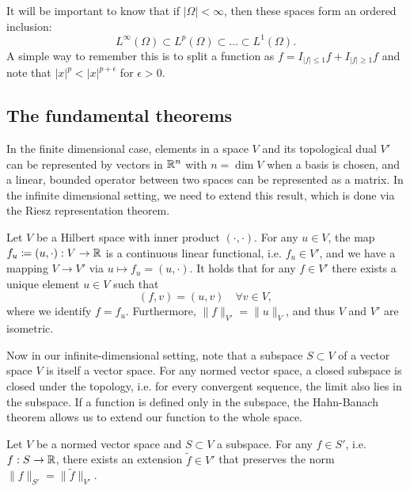 It will be important to know that if $|\Omega|<\infty$, then these spaces form an ordered inclusion: 
\begin{equation}
    L^\infty(\Omega) \subset L^p(\Omega) \subset \dots \subset L^1(\Omega).
\end{equation}
A simple way to remember this is to split a function as $f = I_{|f|\leq 1}f + I_{|f|\geq 1}f$ and note that $|x|^p < |x|^{p+\epsilon}$ for $\epsilon > 0$. 

\subsection{The fundamental theorems}
In the finite dimensional case, elements in a space $V$ and its topological dual $V'$ can be represented by vectors in $\mathbb{R}^n$ with $n=\dim V$ when a basis is chosen, and a linear, bounded operator between two spaces can be represented as a matrix. In the infinite dimensional setting, we need to extend this result, which is done via the Riesz representation theorem. 

\begin{theorem}
    Let $V$ be a Hilbert space with inner product $(\cdot,\cdot)$. For any $u\in V$, the map $f_u\coloneqq (u,\cdot):V\to \mathbb{R}$ is a continuous linear functional, i.e. $f_u\in V'$, and we have a mapping $V\to V'$ via $u\mapsto f_u=(u,\cdot)$. It holds that for any $f\in V'$ there exists a unique element $u\in V$ such that 
    \begin{equation}
        (f,v) = (u,v)\quad \forall v\in V,
    \end{equation}
    where we identify $f=f_u$. Furthermore, $\|f\|_{V'} = \|u\|_V$, and thus $V$ and $V'$ are isometric.
\end{theorem}

Now in our infinite-dimensional setting, note that a subspace $S\subset V$ of a vector space $V$ is itself a vector space. For any normed vector space, a closed subspace is closed under the topology, i.e. for every convergent sequence, the limit also lies in the subspace. If a function is defined only in the subspace, the Hahn-Banach theorem allows us to extend our function to the whole space. 
\begin{theorem}
    Let $V$ be a normed vector space and $S\subset V$ a subspace. For any $f\in S'$, i.e. $f:S\to\mathbb{R}$, there exists an extension $\tilde{f}\in V'$ that preserves the norm $\|f\|_{S'} = \|\tilde{f}\|_{V'}$.
\end{theorem}

